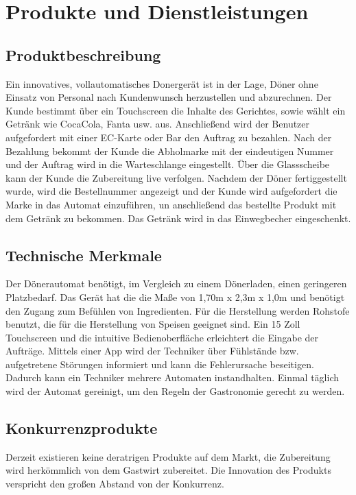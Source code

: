 
\section{Produkte und Dienstleistungen}

\subsection{Produktbeschreibung} 
Ein innovatives, vollautomatisches Donergerät ist in der Lage, Döner ohne
Einsatz von Personal nach Kundenwunsch herzustellen und abzurechnen. Der Kunde
bestimmt über ein Touchscreen die Inhalte des Gerichtes, sowie wählt ein Getränk
wie CocaCola, Fanta usw. aus. Anschließend wird der Benutzer aufgefordert mit
einer EC-Karte oder Bar den Auftrag zu bezahlen. Nach der Bezahlung bekommt der
Kunde die Abholmarke mit der eindeutigen Nummer und der Auftrag wird in die
Warteschlange eingestellt. Über die Glassscheibe kann der Kunde die Zubereitung
live verfolgen. Nachdem der Döner fertiggestellt wurde, wird die Bestellnummer
angezeigt und der Kunde wird aufgefordert die Marke in das Automat einzuführen,
un anschließend das bestellte Produkt mit dem Getränk zu bekommen. Das Getränk
wird in das Einwegbecher eingeschenkt.
\subsection{Technische Merkmale}
Der Dönerautomat benötigt, im Vergleich zu einem Dönerladen, einen geringeren
Platzbedarf. Das Gerät hat die die Maße von 1,70m x 2,3m x 1,0m und benötigt den
Zugang zum Befühlen von Ingredienten. Für die Herstellung werden Rohstofe
benutzt, die für die Herstellung von Speisen geeignet sind. Ein 15 Zoll
Touchscreen und die intuitive Bedienoberfläche erleichtert die Eingabe der
Aufträge. Mittels einer App wird der Techniker über Fühlstände bzw. aufgetretene
Störungen informiert und kann die Fehlerursache beseitigen. Dadurch kann ein
Techniker mehrere Automaten instandhalten. Einmal täglich wird der Automat
gereinigt, um den Regeln der Gastronomie gerecht zu werden.
\subsection{Konkurrenzprodukte}
Derzeit existieren keine deratrigen Produkte auf dem Markt, die Zubereitung wird
herkömmlich von dem Gastwirt zubereitet. Die Innovation des Produkts verspricht
den großen Abstand von der Konkurrenz.
